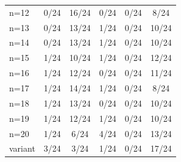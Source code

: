 \begin{tabular}{lccccc}
n=12 & \cellcolor[HTML]{FFFFFF} 0/24 & \cellcolor[HTML]{EA4646} 16/24 & \cellcolor[HTML]{9670BD} 0/24 & \cellcolor[HTML]{8FEB32} 0/24 & \cellcolor[HTML]{19C8C8} 8/24 \\
n=13 & \cellcolor[HTML]{FFFFFF} 0/24 & \cellcolor[HTML]{EA4646} 13/24 & \cellcolor[HTML]{9670BD} 1/24 & \cellcolor[HTML]{8FEB32} 0/24 & \cellcolor[HTML]{19C8C8} 10/24 \\
n=14 & \cellcolor[HTML]{FFFFFF} 0/24 & \cellcolor[HTML]{EA4646} 13/24 & \cellcolor[HTML]{9670BD} 1/24 & \cellcolor[HTML]{8FEB32} 0/24 & \cellcolor[HTML]{19C8C8} 10/24 \\
n=15 & \cellcolor[HTML]{FFFFFF} 1/24 & \cellcolor[HTML]{EA4646} 10/24 & \cellcolor[HTML]{9670BD} 1/24 & \cellcolor[HTML]{8FEB32} 0/24 & \cellcolor[HTML]{19C8C8} 12/24 \\
n=16 & \cellcolor[HTML]{FFFFFF} 1/24 & \cellcolor[HTML]{EA4646} 12/24 & \cellcolor[HTML]{9670BD} 0/24 & \cellcolor[HTML]{8FEB32} 0/24 & \cellcolor[HTML]{19C8C8} 11/24 \\
n=17 & \cellcolor[HTML]{FFFFFF} 1/24 & \cellcolor[HTML]{EA4646} 14/24 & \cellcolor[HTML]{9670BD} 1/24 & \cellcolor[HTML]{8FEB32} 0/24 & \cellcolor[HTML]{19C8C8} 8/24 \\
n=18 & \cellcolor[HTML]{FFFFFF} 1/24 & \cellcolor[HTML]{EA4646} 13/24 & \cellcolor[HTML]{9670BD} 0/24 & \cellcolor[HTML]{8FEB32} 0/24 & \cellcolor[HTML]{19C8C8} 10/24 \\
n=19 & \cellcolor[HTML]{FFFFFF} 1/24 & \cellcolor[HTML]{EA4646} 12/24 & \cellcolor[HTML]{9670BD} 1/24 & \cellcolor[HTML]{8FEB32} 0/24 & \cellcolor[HTML]{19C8C8} 10/24 \\
n=20 & \cellcolor[HTML]{FFFFFF} 1/24 & \cellcolor[HTML]{EA4646} 6/24 & \cellcolor[HTML]{9670BD} 4/24 & \cellcolor[HTML]{8FEB32} 0/24 & \cellcolor[HTML]{19C8C8} 13/24 \\
variant & \cellcolor[HTML]{FFFFFF} 3/24 & \cellcolor[HTML]{EA4646} 3/24 & \cellcolor[HTML]{9670BD} 1/24 & \cellcolor[HTML]{8FEB32} 0/24 & \cellcolor[HTML]{19C8C8} 17/24 \\
\bottomrule
\end{tabular}
